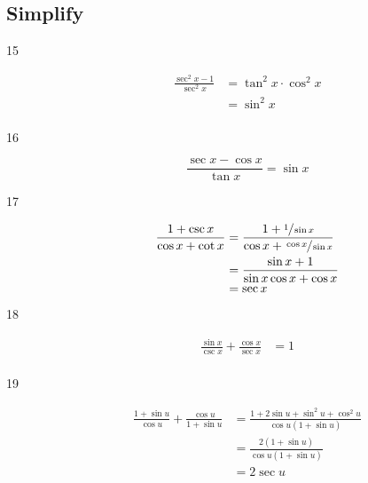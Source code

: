 \documentclass{exam}
\begin{document}
  \subsection{Simplify}
  \begin{description}

    \item[15]
      \begin{align*}
        \frac{\sec^2 x - 1}{\sec^2 x} & = \tan^2 x \cdot \cos^2 x \\
                                      & = \sin^2 x \\
      \end{align*}

    \item[16] 
      \[
        \frac{\sec x - \cos x}{\tan x} = \sin x
      \]

    \item[17] 
      \begin{align*}
        \frac{1 + \csc x}{\cos x + \cot x} & = \frac{1 + \sfrac{1}{\sin x}}{\cos x + \sfrac{\cos x}{\sin x}} \\
                                           & = \frac{\sin x + 1}{\sin x \cos x + \cos x} \\
                                           & = \sec x \\
      \end{align*}

    \item[18] 
      \begin{align*}
        \frac{\sin x}{\csc x} + \frac{\cos x}{\sec x} &= 1 \\
      \end{align*}

    \item[19] 
      \begin{align*}
        \frac{1 + \sin u}{\cos u} + \frac{\cos u}{1 + \sin u} & = \frac{1 + 2 \sin u + \sin^2 u + \cos^2 u}{\cos u (1 + \sin u)} \\
                                                              & = \frac{2(1 + \sin u)}{\cos u (1 + \sin u)} \\
                                                              & = 2 \sec u \\
      \end{align*}


  \end{description}
\end{document}
